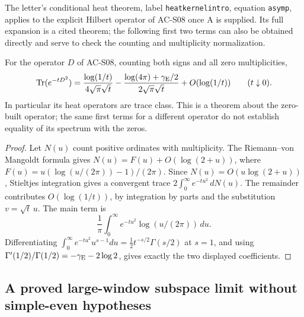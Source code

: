 The letter's conditional heat theorem, label \texttt{heatkernelintro},
equation \texttt{asymp}, applies to the explicit Hilbert operator of
AC-S08 once A is supplied.  Its full expansion is a cited theorem;
the following first two terms can also be obtained directly and
serve to check the counting and multiplicity normalization.

\begin{proposition}
\label{AC-S17}
For the operator \(D\) of AC-S08, counting both signs and all zero
multiplicities,
\[
 \operatorname{Tr}(e^{-tD^2})
 =\frac{\log(1/t)}{4\sqrt\pi\sqrt t}
 -\frac{\log(4\pi)+\gamma_{\rm E}/2}{2\sqrt\pi\sqrt t}
 +O(\log(1/t))\qquad(t\downarrow0).
\]
In particular its heat operators are trace class.  This is a theorem
about the zero-built operator; the same first terms for a different
operator do not establish equality of its spectrum with the zeros.
\end{proposition}
\begin{proof}
Let \(N(u)\) count positive ordinates with multiplicity.  The
Riemann--von Mangoldt formula gives
\(N(u)=F(u)+O(\log(2+u))\), where
\(F(u)=u(\log(u/(2\pi))-1)/(2\pi)\).  Since
\(N(u)=O(u\log(2+u))\), Stieltjes integration gives a convergent
trace \(2\int_0^\infty e^{-tu^2}\,dN(u)\).
The remainder contributes \(O(\log(1/t))\), by integration by parts
and the substitution \(v=\sqrt t\,u\).
The main term is
\[
 \frac1\pi\int_0^\infty e^{-tu^2}\log(u/(2\pi))\,du.
\]
Differentiating
\(\int_0^\infty e^{-tu^2}u^{s-1}du
   =\tfrac12t^{-s/2}\Gamma(s/2)\)
at \(s=1\), and using
\(\Gamma'(1/2)/\Gamma(1/2)=-\gamma_{\rm E}-2\log2\),
gives exactly the two displayed coefficients.
\end{proof}

\subsection{A proved large-window subspace limit without simple-even hypotheses}

